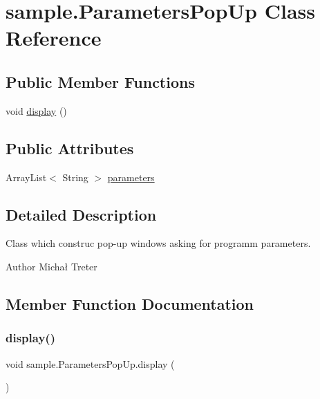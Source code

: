 \hypertarget{classsample_1_1_parameters_pop_up}{}\section{sample.\+Parameters\+Pop\+Up Class Reference}
\label{classsample_1_1_parameters_pop_up}
\subsection*{Public Member Functions}
\begin{DoxyCompactItemize}
\item 
void \hyperlink{classsample_1_1_parameters_pop_up_a7960a4a86b7d805e5a8df84a9f9ec4b0}{display} ()
\end{DoxyCompactItemize}
\subsection*{Public Attributes}
\begin{DoxyCompactItemize}
\item 
Array\+List$<$ String $>$ \hyperlink{classsample_1_1_parameters_pop_up_a2548fa7434a4183e0ecb9df1f68c4158}{parameters}
\end{DoxyCompactItemize}


\subsection{Detailed Description}
Class which construc pop-\/up windows asking for programm parameters. \begin{DoxyAuthor}{Author}
Michał Treter 
\end{DoxyAuthor}


\subsection{Member Function Documentation}
\mbox{\label{classsample_1_1_parameters_pop_up_a7960a4a86b7d805e5a8df84a9f9ec4b0}} 
\subsubsection{\texorpdfstring{display()}{display()}}
{\footnotesize\ttfamily void sample.\+Parameters\+Pop\+Up.\+display (\begin{DoxyParamCaption}{ }\end{DoxyParamCaption})}

